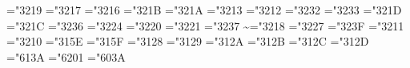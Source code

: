 {  \mathchardef\approx="3219
  \mathchardef\succeq="3217
  \mathchardef\preceq="3216
  \mathchardef\supset="321B
  \mathchardef\subset="321A
  \mathchardef\supseteq="3213
  \mathchardef\subseteq="3212
  \mathchardef\in="3232
  \mathchardef\ni="3233 
  \let\owns=\ni
  \mathchardef\gg="321D
  \mathchardef\ll="321C
  \mathchardef\not="3236
  \mathchardef\leftrightarrow="3224
  \mathchardef\leftarrow="3220 
  \let\gets=\leftarrow
  \mathchardef\rightarrow="3221 
  \let\to=\rightarrow
  \mathchardef\mapstochar="3237 
  \def\mapsto{\mapstochar\rightarrow}
  \mathchardef\sim="3218
  \mathchardef\simeq="3227
  \mathchardef\perp="323F
  \mathchardef\equiv="3211
  \mathchardef\asymp="3210
  \mathchardef\smile="315E
  \mathchardef\frown="315F
  \mathchardef\leftharpoonup="3128
  \mathchardef\leftharpoondown="3129
  \mathchardef\rightharpoonup="312A
  \mathchardef\rightharpoondown="312B
  \def\Relbar{\mathrel=}
  \mathchardef\lhook="312C \def\hookrightarrow{\lhook\joinrel\rightarrow}
  \mathchardef\rhook="312D \def\hookleftarrow{\leftarrow\joinrel\rhook}
  \def\bowtie{\mathrel\triangleright\joinrel\mathrel\triangleleft}
  \def\models{\mathrel|\joinrel=}
  \def\Longrightarrow{\Relbar\joinrel\Rightarrow}
  \def\longrightarrow{\relbar\joinrel\rightarrow}
  \def\longleftarrow{\leftarrow\joinrel\relbar}
  \def\Longleftarrow{\Leftarrow\joinrel\Relbar}
  \def\longmapsto{\mapstochar\longrightarrow}
  \def\longleftrightarrow{\leftarrow\joinrel\rightarrow}
  \def\Longleftrightarrow{\Leftarrow\joinrel\Rightarrow}
  \def\iff{\;\Longleftrightarrow\;}
  \mathchardef\ldotp="613A %
  \mathchardef\cdotp="6201 %
  \mathchardef\colon="603A %
  \def\ldots{\mathinner{\ldotp\ldotp\ldotp}}
  \def\cdots{\mathinner{\cdotp\cdotp\cdotp}}
  \def\vdots{\vbox{\baselineskip4\p@ \lineskiplimit\z@
    \kern6\p@\hbox{.}\hbox{.}\hbox{.}}}
  \def\ddots{\mathinner{\mkern1mu\raise7\p@\vbox{\kern7\p@\hbox{.}}\mkern2mu
    \raise4\p@\hbox{.}\mkern2mu\raise\p@\hbox{.}\mkern1mu}}
  \def\acute{\mathaccent"7013 }
  \def\grave{\mathaccent"7012 }
  \def\ddot{\mathaccent"707F }
  \def\tilde{\mathaccent"707E }
  \def\bar{\mathaccent"7016 }
  \def\breve{\mathaccent"7015 }
  \def\check{\mathaccent"7014 }
  \def\hat{\mathaccent"705E }
  \def\vec{\mathaccent"017E }
  \def\dot{\mathaccent"705F }
  \def\widetilde{\mathaccent"0365 }
  \def\widehat{\mathaccent"0362 }
  \def\lmoustache{\delimiter"437A340 }%
  \def\rmoustache{\delimiter"537B341 }%
  \def\lgroup{\delimiter"4\hex\bffam 2833A }%
}
